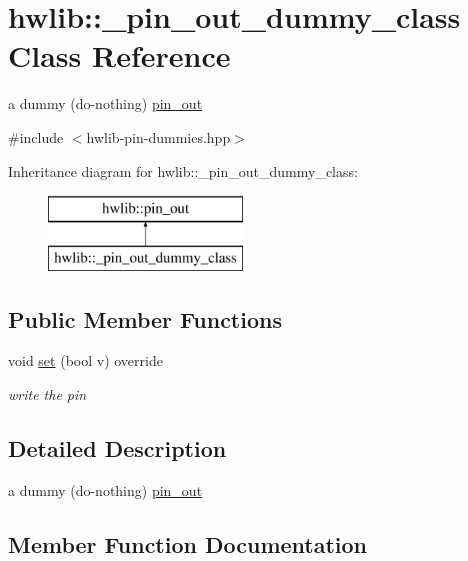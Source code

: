 \hypertarget{classhwlib_1_1__pin__out__dummy__class}{}\section{hwlib\+:\+:\+\_\+pin\+\_\+out\+\_\+dummy\+\_\+class Class Reference}
\label{classhwlib_1_1__pin__out__dummy__class}


a dummy (do-\/nothing) \hyperlink{classhwlib_1_1pin__out}{pin\+\_\+out}  




{\ttfamily \#include $<$hwlib-\/pin-\/dummies.\+hpp$>$}

Inheritance diagram for hwlib\+:\+:\+\_\+pin\+\_\+out\+\_\+dummy\+\_\+class\+:\begin{figure}[H]
\begin{center}
\leavevmode
\includegraphics[height=2.000000cm]{classhwlib_1_1__pin__out__dummy__class}
\end{center}
\end{figure}
\subsection*{Public Member Functions}
\begin{DoxyCompactItemize}
\item 
void \hyperlink{classhwlib_1_1__pin__out__dummy__class_a2a1c7ef6046fbf45a92f5036632e4655}{set} (bool v) override
\begin{DoxyCompactList}\small\item\em write the pin \end{DoxyCompactList}\end{DoxyCompactItemize}


\subsection{Detailed Description}
a dummy (do-\/nothing) \hyperlink{classhwlib_1_1pin__out}{pin\+\_\+out} 

\subsection{Member Function Documentation}
